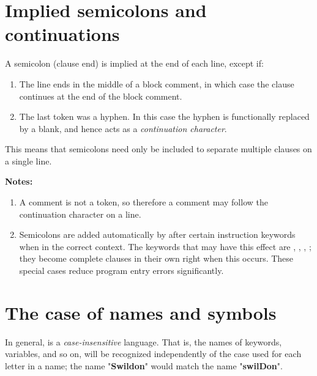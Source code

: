 \section{Implied semicolons and continuations}\label{refsemis}
 A semicolon (clause end) is implied at the end of each line, except
if:
\begin{enumerate}
\item The line ends in the middle of a block comment, in which case the
clause continues at the end of the block comment.
\item The last token was a hyphen.
In this case the hyphen is functionally replaced by a blank, and hence
acts as a \emph{continuation character}.
\end{enumerate}
 This means that semicolons need only be included to separate
multiple clauses on a single line.
\begin{shaded}\noindent
\textbf{Notes:}
\begin{enumerate}
\item A comment is not a token, so therefore a comment may follow the
continuation character on a line.
\item Semicolons are added automatically by \nr{} after certain
instruction keywords when in the correct context.
The keywords that may have this effect are ,
, , ; they become
complete clauses in their own right when this occurs.
These special cases reduce program entry errors significantly.
\end{enumerate}
\end{shaded}\indent
\section{The case of names and symbols}\label{refcase}
 
In general, \nr{} is a \emph{case-insensitive} language.
That is, the names of keywords, variables, and so on, will be recognized
independently of the case used for each letter in a name; the name
"\textbf{Swildon}" would match the name
"\textbf{swilDon}".
 
